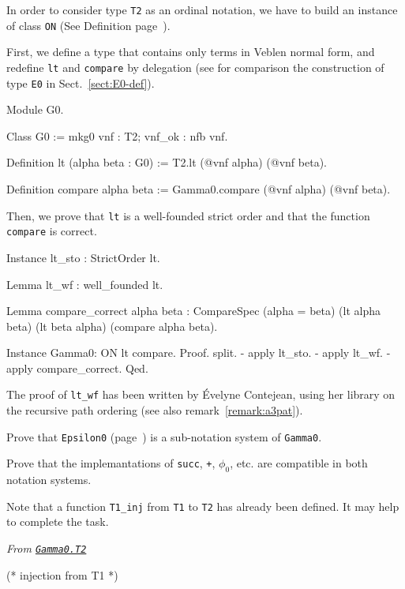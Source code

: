 {In order to consider type \texttt{T2} as an ordinal notation, we have to build an instance of class \texttt{ON} (See Definition page~\pageref{types:ON}).

First, we define a type that contains only terms in Veblen normal form, and redefine \texttt{lt} and \texttt{compare} by delegation (see for comparison the construction of type \texttt{E0} in Sect.~\vref{sect:E0-def}).

\begin{Coqsrc}
Module G0.

Class G0 := mkg0 {vnf : T2; vnf_ok : nfb vnf}.

Definition lt (alpha beta : G0) := T2.lt (@vnf alpha) (@vnf beta).

Definition compare alpha beta := Gamma0.compare (@vnf alpha) (@vnf beta).
\end{Coqsrc}

Then, we prove that \texttt{lt} is a well-founded strict order and that the
function \texttt{compare} is correct.

\begin{Coqsrc}
Instance lt_sto : StrictOrder lt.

Lemma lt_wf : well_founded lt.

Lemma compare_correct alpha beta :
  CompareSpec (alpha = beta) (lt alpha beta) (lt beta alpha)
              (compare alpha beta).

Instance Gamma0: ON lt  compare.
Proof.
  split.
  - apply lt_sto.
  - apply lt_wf. 
  - apply compare_correct.
Qed.
\end{Coqsrc}


\begin{remark}
The proof of \texttt{lt\_wf} has been written by \'Evelyne Contejean, using her library on the recursive path ordering (see also remark~\vref{remark:a3pat}).
\end{remark}

\begin{project}
Prove that \texttt{Epsilon0} (page~\pageref{instance-epsilon0})
is a sub-notation system of \texttt{Gamma0}.

Prove that the implemantations of \texttt{succ}, \texttt{+}, $\phi_0$, etc.
are compatible in both notation systems.

Note that a function \texttt{T1\_inj} from \texttt{T1} to \texttt{T2} has already been defined. It may help to complete the task.



\noindent\emph{From \href{../theories/html/hydras.Gamma0.T2.html\#T1_to_T2}%
{\texttt{Gamma0.T2}}}
\begin{Coqsrc}
(* injection from T1 *)


\end{Coqsrc}
\end{project}}
